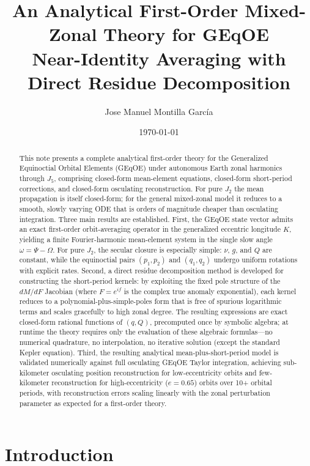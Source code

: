 \documentclass[11pt]{article}
\title{An Analytical First-Order Mixed-Zonal Theory for GEqOE\\
\large Near-Identity Averaging with Direct Residue Decomposition}
\author{Jose Manuel Montilla García}
\date{\today}
\begin{document}
\maketitle

\begin{abstract}
This note presents a complete analytical first-order theory for the
Generalized Equinoctial Orbital Elements (GEqOE) under autonomous Earth zonal
harmonics through $J_5$, comprising closed-form mean-element equations,
closed-form short-period corrections, and closed-form osculating
reconstruction. For pure $J_2$ the mean propagation is itself closed-form;
for the general mixed-zonal model it reduces to a smooth, slowly varying ODE
that is orders of magnitude cheaper than osculating integration.
Three main results are established.
First, the GEqOE state vector admits an exact first-order orbit-averaging
operator in the generalized eccentric longitude $K$, yielding a finite
Fourier-harmonic mean-element system in the single slow angle
$\omega = \Psi - \Omega$. For pure $J_2$, the secular closure is especially
simple: $\nu$, $g$, and $Q$ are constant, while the equinoctial pairs
$(p_1,p_2)$ and $(q_1,q_2)$ undergo uniform rotations with explicit rates.
Second, a direct residue decomposition method is developed for constructing
the short-period kernels: by exploiting the fixed pole structure of the
$dM/dF$ Jacobian (where $F = e^{if}$ is the complex true anomaly exponential),
each kernel reduces to a polynomial-plus-simple-poles form that is free of
spurious logarithmic terms and scales gracefully to high zonal degree. The
resulting expressions are exact closed-form rational functions of $(q, Q)$,
precomputed once by symbolic algebra; at runtime the theory requires only the
evaluation of these algebraic formulas---no numerical quadrature, no
interpolation, no iterative solution (except the standard Kepler equation).
Third, the resulting analytical mean-plus-short-period model is validated
numerically against full osculating GEqOE Taylor integration, achieving
sub-kilometer osculating position reconstruction for low-eccentricity orbits
and few-kilometer reconstruction for high-eccentricity ($e = 0.65$) orbits
over 10+ orbital periods, with reconstruction errors scaling linearly with
the zonal perturbation parameter as expected for a first-order theory.
\end{abstract}

\section{Introduction}
\label{sec:intro}
\end{document}

